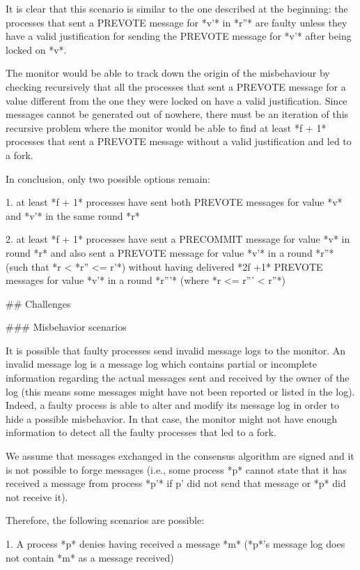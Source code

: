 \documentclass[a4paper,11pt,oneside]{report}
\begin{document}
\begin{markdown}
It is clear that this scenario is similar to the one described at the beginning: the processes that sent a PREVOTE message for *v'* in *r''* are faulty unless they have a valid justification for sending the PREVOTE message for *v'* after being locked on *v*.

The monitor would be able to track down the origin of the misbehaviour by checking recursively that all the processes that sent a PREVOTE message for a value different from the one they were locked on have a valid justification.
Since messages cannot be generated out of nowhere, there must be an iteration of this recursive problem where the monitor would be able to find at least *f + 1* processes that sent a PREVOTE message without a valid justification and led to a fork.

In conclusion, only two possible options remain:

1. at least *f + 1* processes have sent both PREVOTE messages for value *v* and *v'* in the same round *r*

2. at least *f + 1* processes have sent a PRECOMMIT message for value *v* in round *r* and also sent a PREVOTE message for value *v'* in a round *r''* (such that *r < *r'' <= r'*) without having delivered *2f +1* PREVOTE messages for value *v'* in a round *r'''* (where *r <= r''' < r''*)

## Challenges

### Misbehavior scenarios

It is possible that faulty processes send invalid message logs to the monitor. An invalid message log is a message log which contains partial or incomplete information regarding the actual messages sent and received by the owner of the log (this means some messages might have not been reported or listed in the log).
Indeed, a faulty process is able to alter and modify its message log in order to hide a possible misbehavior. In that case, the monitor might not have enough information to detect all the faulty processes that led to a fork. 

We assume that messages exchanged in the consensus algorithm are signed and it is not possible to forge messages (i.e., some process *p* cannot state that it has received a message from process *p'* if p' did not send that message or *p* did not receive it). 

Therefore, the following scenarios are possible:
 
1. A process *p* denies having received a message *m* (*p*'s message log does not contain *m* as a message received)  


\end{markdown}
\end{document}
